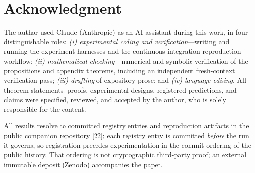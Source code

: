 \documentclass[lettersize,onecolumn]{IEEEtran}
\theoremstyle{definition}
\theoremstyle{remark}
\begin{document}
\section*{Acknowledgment}
The author used Claude (Anthropic) as an AI assistant during this work, in four
distinguishable roles: \emph{(i) experimental coding and verification}---writing and
running the experiment harnesses and the continuous-integration reproduction workflow;
\emph{(ii) mathematical checking}---numerical and symbolic verification of the
propositions and appendix theorems, including an independent fresh-context
verification pass; \emph{(iii) drafting} of expository prose; and \emph{(iv) language
editing}. All theorem statements, proofs, experimental designs, registered
predictions, and claims were specified, reviewed, and accepted by the author, who is
solely responsible for the content.

All results resolve to committed registry entries and reproduction artifacts in the
public companion repository [22]; each registry entry is committed
\emph{before} the run it governs, so registration precedes experimentation in the
commit ordering of the public history. That ordering is not cryptographic third-party
proof; an external immutable deposit (Zenodo) accompanies the paper.
\end{document}
